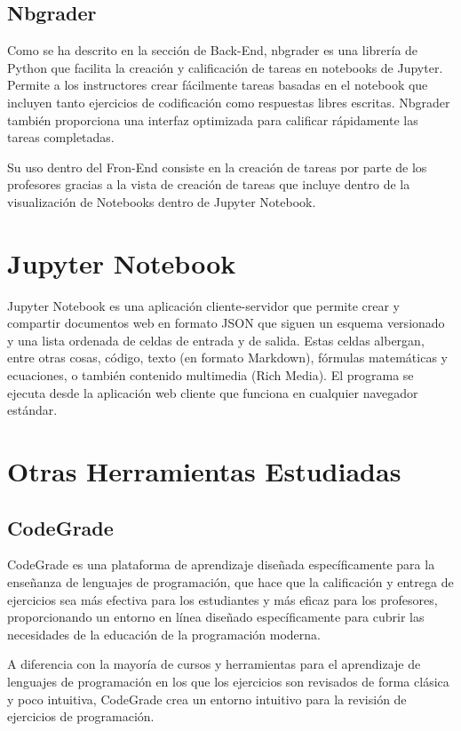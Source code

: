 \subsection{Nbgrader}
Como se ha descrito en la sección de Back-End, nbgrader es una librería de Python que facilita la creación y calificación de tareas en notebooks de Jupyter. Permite a los instructores crear fácilmente tareas basadas en el notebook que incluyen tanto ejercicios de codificación como respuestas libres escritas. Nbgrader también proporciona una interfaz optimizada para calificar rápidamente las tareas completadas.

Su uso dentro del Fron-End consiste en la creación de tareas por parte de los profesores gracias a la vista de creación de tareas que incluye dentro de la visualización de Notebooks dentro de Jupyter Notebook. 


\section{Jupyter Notebook}
Jupyter Notebook\cite{tool:JupyterNotebooks} es una aplicación cliente-servidor que permite crear y compartir documentos web en formato JSON que siguen un esquema versionado y una lista ordenada de celdas de entrada y de salida. Estas celdas albergan, entre otras cosas, código, texto (en formato Markdown), fórmulas matemáticas y ecuaciones, o también contenido multimedia (Rich Media). El programa se ejecuta desde la aplicación web cliente que funciona en cualquier navegador estándar.



\section{Otras Herramientas Estudiadas} \label{OtrasHerramientas}
\subsection{CodeGrade}
CodeGrade\cite{tool:CodeGrade} es una plataforma de aprendizaje diseñada específicamente para la enseñanza de lenguajes de programación, que hace que la calificación y entrega de ejercicios sea más efectiva para los estudiantes y más eficaz para los profesores, proporcionando un entorno en línea diseñado específicamente para cubrir las necesidades de la educación de la programación moderna.

A diferencia con la mayoría de cursos y herramientas para el aprendizaje de lenguajes de programación en los que los ejercicios son revisados de forma clásica y poco intuitiva, CodeGrade crea un entorno intuitivo para la revisión de ejercicios de programación.


